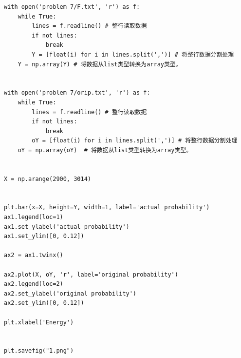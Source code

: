 \documentclass[a4paper,11pt]{article}
\begin{document}
\begin{appendices}
\begin{lstlisting}
with open('problem 7/F.txt', 'r') as f:
    while True:
        lines = f.readline() # 整行读取数据
        if not lines:
            break
        Y = [float(i) for i in lines.split(',')] # 将整行数据分割处理
    Y = np.array(Y) # 将数据从list类型转换为array类型。


with open('problem 7/orip.txt', 'r') as f:
    while True:
        lines = f.readline() # 整行读取数据
        if not lines:
            break
        oY = [float(i) for i in lines.split(',')] # 将整行数据分割处理
    oY = np.array(oY)  # 将数据从list类型转换为array类型。


X = np.arange(2900, 3014)


plt.bar(x=X, height=Y, width=1, label='actual probability')
ax1.legend(loc=1)
ax1.set_ylabel('actual probability')
ax1.set_ylim([0, 0.12])

ax2 = ax1.twinx()

ax2.plot(X, oY, 'r', label='original probability')
ax2.legend(loc=2)
ax2.set_ylabel('original probability')
ax2.set_ylim([0, 0.12])

plt.xlabel('Energy')


plt.savefig("1.png")

	
\end{lstlisting}

\end{appendices}
\end{document}
